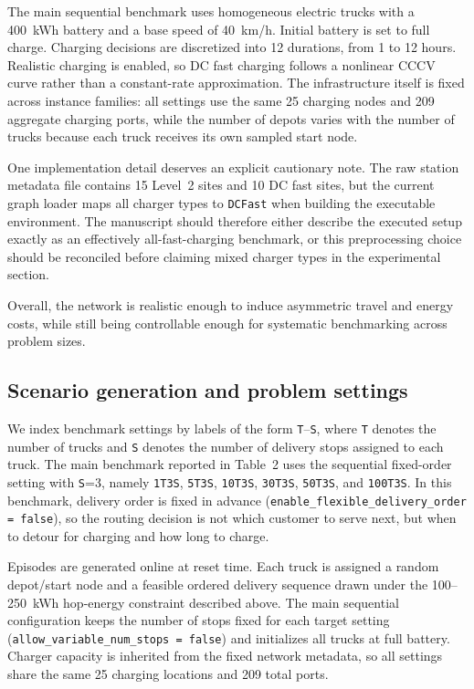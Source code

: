 The main sequential benchmark uses homogeneous electric trucks with a 400~kWh battery and a base speed of 40~km/h. Initial battery is set to full charge. Charging decisions are discretized into 12 durations, from 1 to 12 hours. Realistic charging is enabled, so DC fast charging follows a nonlinear CCCV curve rather than a constant-rate approximation. The infrastructure itself is fixed across instance families: all settings use the same 25 charging nodes and 209 aggregate charging ports, while the number of depots varies with the number of trucks because each truck receives its own sampled start node.

One implementation detail deserves an explicit cautionary note. The raw station metadata file contains 15 Level~2 sites and 10 DC fast sites, but the current graph loader maps all charger types to \texttt{DCFast} when building the executable environment. The manuscript should therefore either describe the executed setup exactly as an effectively all-fast-charging benchmark, or this preprocessing choice should be reconciled before claiming mixed charger types in the experimental section.

Overall, the network is realistic enough to induce asymmetric travel and energy costs, while still being controllable enough for systematic benchmarking across problem sizes.

\subsection{Scenario generation and problem settings}
\label{sec:scenario-generation}

We index benchmark settings by labels of the form \texttt{T}--\texttt{S}, where \texttt{T} denotes the number of trucks and \texttt{S} denotes the number of delivery stops assigned to each truck. The main benchmark reported in Table~2 uses the sequential fixed-order setting with \texttt{S}=3, namely \texttt{1T3S}, \texttt{5T3S}, \texttt{10T3S}, \texttt{30T3S}, \texttt{50T3S}, and \texttt{100T3S}. In this benchmark, delivery order is fixed in advance (\texttt{enable\_flexible\_delivery\_order = false}), so the routing decision is not which customer to serve next, but when to detour for charging and how long to charge.

Episodes are generated online at reset time. Each truck is assigned a random depot/start node and a feasible ordered delivery sequence drawn under the 100--250~kWh hop-energy constraint described above. The main sequential configuration keeps the number of stops fixed for each target setting (\texttt{allow\_variable\_num\_stops = false}) and initializes all trucks at full battery. Charger capacity is inherited from the fixed network metadata, so all settings share the same 25 charging locations and 209 total ports.

